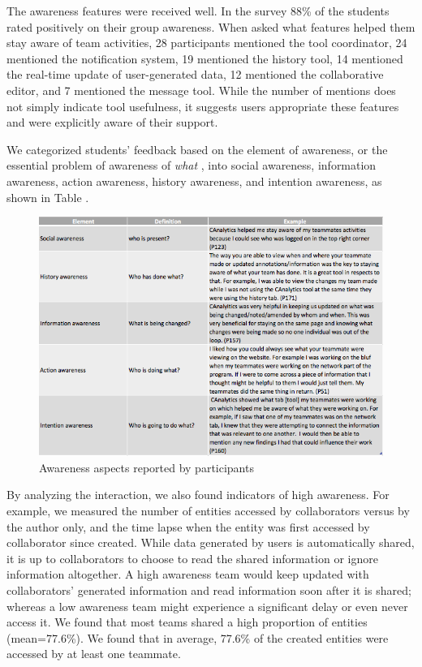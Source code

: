 \documentclass[]{article}
\begin{document}
The awareness features were received well. In the survey 88\% of the
students rated positively on their group awareness. When asked what
features helped them stay aware of team activities, 28 participants
mentioned the tool coordinator, 24 mentioned the notification system, 19
mentioned the history tool, 14 mentioned the real-time update of
user-generated data, 12 mentioned the collaborative editor, and 7
mentioned the message tool. While the number of mentions does not simply
indicate tool usefulness, it suggests users appropriate these features
and were explicitly aware of their support.

We categorized students' feedback based on the element of awareness, or
the essential problem of awareness of \emph{what}
\autocite{Schmidt2002}, into social awareness, information awareness,
action awareness, history awareness, and intention awareness, as shown
in Table \autocite{tab:awareness}.

\begin{no-prefix-figure-caption}

\begin{figure}
\centering
\includegraphics{./questionnaire/awareness.png}
\caption{Awareness aspects reported by
participants}\label{tab:awareness}
\end{figure}

\end{no-prefix-figure-caption}

By analyzing the interaction, we also found indicators of high
awareness. For example, we measured the number of entities accessed by
collaborators versus by the author only, and the time lapse when the
entity was first accessed by collaborator since created. While data
generated by users is automatically shared, it is up to collaborators to
choose to read the shared information or ignore information altogether.
A high awareness team would keep updated with collaborators' generated
information and read information soon after it is shared; whereas a low
awareness team might experience a significant delay or even never access
it. We found that most teams shared a high proportion of entities
(mean=77.6\%). We found that in average, 77.6\% of the created entities
were accessed by at least one teammate.
\end{document}
